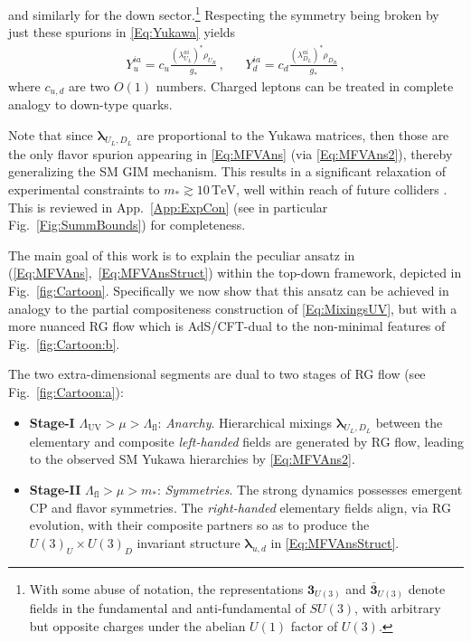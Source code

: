 \documentclass[aps,prl,twocolumn,showpacs,10pt,preprintnumbers,nofootinbib]{revtex4-2}
\newcommand{\TeV}{\,\mathrm{TeV}}
\newcommand{\gst}{g_*}
\newcommand{\mst}{m_*}
\newcommand{\LUV}{\Lambda_{\text{UV}}}
\begin{document}
and similarly for the down sector.\footnote{With some abuse of notation, the representations $\mathbf{3}_{U(3)}$ and $\bar{\mathbf{3}}_{U(3)}$ denote fields in the fundamental and anti-fundamental of $SU(3)$, with arbitrary but opposite charges under the abelian $U(1)$ factor of $U(3)$.} Respecting the symmetry being broken by just these spurions in \eqref{Eq:Yukawa} yields 
\begin{align}\label{Eq:MFVAns2}
    Y_u^{ia}= c_u  \frac{ (\lambda_{U_L}^{ai})^* \rho_{U_R}}{\gst} \,,&& Y_d^{ia}= c_d  \frac{ (\lambda_{D_L}^{ai})^* \rho_{D_R}}{\gst}\,,
\end{align}
where $c_{u,d}$ are two $O(1)$ numbers. Charged leptons can be treated in complete analogy to down-type quarks.   

Note that since $\boldsymbol{\lambda}_{U_L,D_L}$ are proportional to the Yukawa matrices, then those are the only flavor spurion appearing in \eqref{Eq:MFVAns} (via \eqref{Eq:MFVAns2}), thereby generalizing the SM GIM mechanism. This results in a significant relaxation of experimental constraints to $\mst \gtrsim 10\TeV$, well within reach of future colliders \cite{Redi:2011zi,Barbieri:2012tu, Glioti:2024hye}. This is reviewed in App.~\ref{App:ExpCon} (see in particular Fig.~\ref{Fig:SummBounds}) for completeness.

The main goal of this work is to explain the peculiar ansatz in (\ref{Eq:MFVAns},~\ref{Eq:MFVAnsStruct}) within the top-down framework, depicted in Fig.~\ref{fig:Cartoon}. Specifically we now show that this ansatz can be achieved in analogy to the partial compositeness construction of \eqref{Eq:MixingsUV}, but with a more nuanced RG flow which is AdS/CFT-dual to the non-minimal features of Fig.~\ref{fig:Cartoon:b}. 

The two extra-dimensional segments are dual to two stages of RG flow (see Fig.~\ref{fig:Cartoon:a}):
\begin{itemize}
    \item \textbf{Stage-I} $\LUV > \mu > \Lambda_{\text{fl}}$: \emph{Anarchy}. Hierarchical mixings  $\boldsymbol{\lambda}_{U_L,D_L}$ between the elementary and composite \textit{left-handed} fields are generated by RG flow, leading to the observed SM Yukawa hierarchies by \eqref{Eq:MFVAns2}.
    \item \textbf{Stage-II} $\Lambda_{\text{fl}} > \mu > m_*$: \emph{Symmetries}. The strong dynamics possesses emergent CP and flavor symmetries.  The \textit{right-handed} elementary fields align, via RG evolution, with their composite partners so as to produce the $U(3)_U\times U(3)_D$ invariant structure $\boldsymbol{\lambda}_{u,d}$ in \eqref{Eq:MFVAnsStruct}.
\end{itemize}
\end{document}
